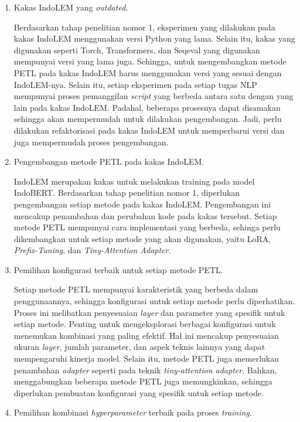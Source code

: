 \begin{enumerate}
    \item Kakas IndoLEM yang \textit{outdated}.
    
    Berdasarkan tahap penelitian nomor 1, eksperimen yang dilakukan pada kakas IndoLEM menggunakan versi Python yang lama. Selain itu, kakas yang digunakan seperti Torch, Transformers, dan Seqeval yang digunakan mempunyai versi yang lama juga. Sehingga, untuk mengembangkan metode PETL pada kakas IndoLEM harus menggunakan versi yang sesuai dengan IndoLEM-nya. Selain itu, setiap eksperimen pada setiap tugas NLP mempunyai proses pemanggilan \textit{script} yang berbeda antara satu dengan yang lain pada kakas IndoLEM. Padahal, beberapa prosesnya dapat disamakan sehingga akan mempermudah untuk dilakukan pengembangan. Jadi, perlu dilakukan refaktorisasi pada kakas IndoLEM untuk memperbarui versi dan juga mempermudah proses pengembangan. 

    \item Pengembangan metode PETL pada kakas IndoLEM.
    
    IndoLEM merupakan kakas untuk melakukan training pada model IndoBERT. Berdasarkan tahap penelitian nomor 1, diperlukan pengembangan setiap metode pada kakas IndoLEM. Pengembangan ini mencakup penambahan dan perubahan kode pada kakas tersebut. Setiap metode PETL mempunyai cara implementasi yang berbeda, sehinga perlu dikembangkan untuk setiap metode yang akan digunakan, yaitu LoRA, \textit{Prefix-Tuning}, dan \textit{Tiny-Attention Adapter}.

    \item Pemilihan konfigurasi terbaik untuk setiap metode PETL.
    
    Setiap metode PETL mempunyai karakteristik yang berbeda dalam penggunaannya, sehingga konfigurasi untuk setiap metode perlu diperhatikan. Proses ini melibatkan penyesuaian \textit{layer} dan parameter yang spesifik untuk setiap metode. Penting untuk mengeksplorasi berbagai konfigurasi untuk menemukan kombinasi yang paling efektif. Hal ini mencakup penyesuaian ukuran \textit{layer}, jumlah parameter, dan aspek teknis lainnya yang dapat mempengaruhi kinerja model. Selain itu, metode PETL juga memerlukan penambahan \textit{adapter} seperti pada teknik \textit{tiny-attention adapter}. Bahkan, menggabungkan beberapa metode PETL juga memungkinkan, sehingga diperlukan pembuatan konfigurasi yang spesifik untuk setiap metode.

    \item Pemilihan kombinasi \textit{hyperparameter} terbaik pada proses \textit{training}.
    

\end{enumerate}
